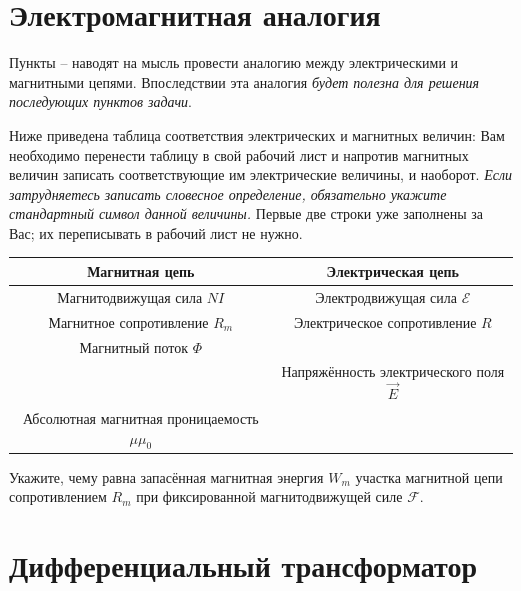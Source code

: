 \part{Электромагнитная аналогия}

Пункты -- наводят на мысль провести аналогию между электрическими и магнитными цепями. Впоследствии эта аналогия \textit{будет полезна для решения последующих пунктов задачи}.

\begin{task}
    \item Ниже приведена таблица соответствия электрических и магнитных величин: Вам необходимо перенести таблицу в свой рабочий лист и напротив магнитных величин записать соответствующие им электрические величины, и наоборот. \textit{Если затрудняетесь записать словесное определение, обязательно укажите стандартный символ данной величины.} Первые две строки уже заполнены за Вас; их переписывать в рабочий лист не нужно.
    \begin{center}
    \begin{tabular}{|c|c|}\hline
         \textbf{Магнитная цепь}& \textbf{Электрическая цепь} \\\hline
         Магнитодвижущая сила $NI$& Электродвижущая сила $\mathcal E$\\\hline
         Магнитное сопротивление $R_m$& Электрическое сопротивление $R$\\\hline
         Магнитный поток $\Phi$ &\\\hline
         &Напряжённость электрического поля $\vec E$ \\\hline
         Абсолютная магнитная проницаемость $\mu\mu_0$&\\\hline
    \end{tabular}
    \end{center}

    \item Укажите, чему равна запасённая магнитная энергия $W_m$ участка магнитной цепи сопротивлением $R_m$ при фиксированной магнитодвижущей силе $\mathcal F$.
\end{task}

\part{Дифференциальный трансформатор}

